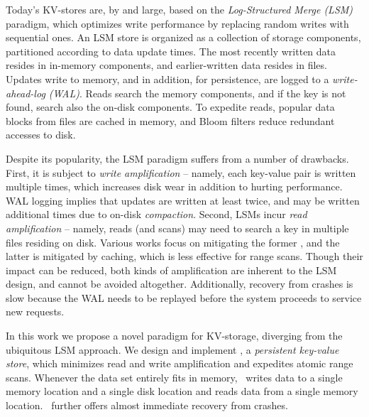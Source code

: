 Today's KV-stores are, by and large, based on the \emph{Log-Structured Merge (LSM)} paradigm, which 
optimizes write performance by replacing random writes with sequential ones.  
An LSM store is organized as a collection of storage components, partitioned according to data update times. 
The most recently written data resides in  in-memory components, and earlier-written data resides in files.  
Updates write to  memory, and in addition, for persistence, are 
 logged to a \emph{write-ahead-log (WAL)}. 
 Reads search the memory components, and if the key is not found, search also the on-disk components.  
To expedite reads, popular data blocks from files are cached in memory,
and Bloom filters  reduce redundant accesses to disk.  
 
Despite its popularity, the LSM paradigm suffers from a number of drawbacks.
First, it is subject to \emph{write amplification} -- namely, each key-value pair is written multiple times, which 
increases disk wear in addition to hurting performance. 
WAL logging implies that updates 
 are written at least twice, and may be written additional times due to on-disk \emph{compaction}.
Second, LSMs incur \emph{read amplification} -- 
namely, reads (and scans) may need to search a key in multiple files residing on disk. 
Various works focus on mitigating the former , and the latter is mitigated by caching, which is  less effective for range scans.  
Though their impact can be reduced, both kinds of amplification are inherent to the LSM design, and cannot be avoided altogether. 
Additionally, recovery from crashes is slow  because the WAL needs to be replayed before the system proceeds to service new requests. 

In this work we propose a novel paradigm for KV-storage, diverging from the ubiquitous LSM approach.  
We design and implement  \sys,  a \emph{persistent key-value store}, which minimizes read and write
amplification and expedites atomic range scans. Whenever the data set entirely fits in memory, \sys\ writes data to a single memory location and a single disk location and reads data from a single memory location. 
 \sys\ further offers almost immediate recovery from  crashes. 
 

